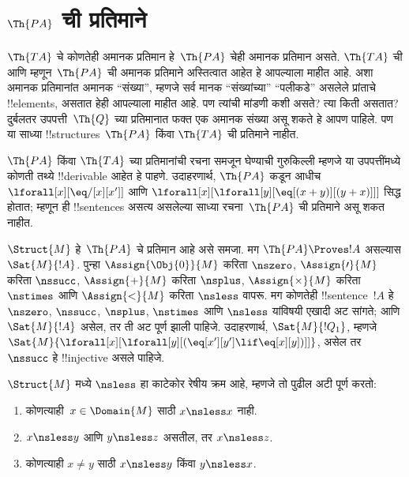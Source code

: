 \documentclass[../../../include/open-logic-section]{subfiles}
\begin{document}
\section{$\Th{PA}$ ची प्रतिमाने}

\begin{explain}
$\Th{TA}$ चे कोणतेही अमानक प्रतिमान हे~$\Th{PA}$ चेही अमानक प्रतिमान
असते. $\Th{TA}$ ची आणि म्हणून~$\Th{PA}$ ची अमानक प्रतिमाने अस्तित्वात
आहेत हे आपल्याला माहीत आहे. अशा अमानक प्रतिमानांत अमानक ``संख्या'', म्हणजे
सर्व मानक ``संख्यांच्या'' ``पलीकडे'' असलेले प्रांताचे !!{element}s, असतात
हेही आपल्याला माहीत आहे. पण त्यांची मांडणी कशी असते? त्या किती असतात?
दुर्बलतर उपपत्ती~$\Th{Q}$ च्या प्रतिमानात फक्त एक अमानक संख्या असू शकते
हे आपण पाहिले. पण या साध्या !!{structure}s~$\Th{PA}$ किंवा $\Th{TA}$ ची
प्रतिमाने नाहीत.

$\Th{PA}$ किंवा $\Th{TA}$ च्या प्रतिमानांची रचना समजून घेण्याची गुरुकिल्ली
म्हणजे या उपपत्तींमध्ये कोणती तथ्ये !!{derivable} आहेत हे पाहणे. उदाहरणार्थ,
$\Th{PA}$ कडून आधीच $\lforall[x][\eq/[x][x']]$ आणि
$\lforall[x][\lforall[y][\eq[(x+y)][(y+x)]]]$ सिद्ध होतात; म्हणून ही
!!{sentence}s असत्य असलेल्या साध्या रचना~$\Th{PA}$ ची प्रतिमाने असू शकत
नाहीत.

$\Struct{M}$ हे~$\Th{PA}$ चे प्रतिमान आहे असे समजा. मग
$\Th{PA} \Proves !A$ असल्यास $\Sat{M}{!A}$. पुन्हा
$\Assign{\Obj{0}}{M}$ करिता $\nszero$, $\Assign{\prime}{M}$ करिता
$\nssucc$, $\Assign{+}{M}$ करिता $\nsplus$,
$\Assign{\times}{M}$ करिता $\nstimes$ आणि $\Assign{<}{M}$ करिता
$\nsless$ वापरू. मग कोणतेही !!{sentence}~$!A$ हे $\nszero$, $\nssucc$,
$\nsplus$, $\nstimes$ आणि $\nsless$ यांविषयी एखादी अट सांगते; आणि
$\Sat{M}{!A}$ असेल, तर ती अट पूर्ण झाली पाहिजे. उदाहरणार्थ,
$\Sat{M}{!Q_1}$, म्हणजे
$\Sat{M}{\lforall[x][\lforall[y][(\eq[x'][y'] \lif \eq[x][y])]]}$,
असेल तर $\nssucc$ हे !!{injective} असले पाहिजे.
\end{explain}

\begin{prop}
$\Struct{M}$ मध्ये $\nsless$ हा काटेकोर रेषीय क्रम आहे, म्हणजे तो पुढील
अटी पूर्ण करतो:
\begin{enumerate}
\item कोणत्याही~$x \in \Domain{M}$ साठी $x \nsless x$ नाही.
\item $x \nsless y$ आणि $y \nsless z$ असतील, तर $x \nsless z$.
\item कोणत्याही $x \neq y$ साठी $x \nsless y$ किंवा $y \nsless x$.
\end{enumerate}
\end{prop}
\end{document}
